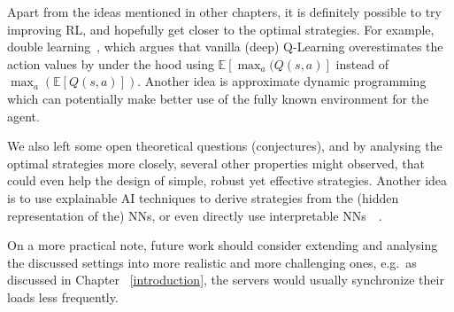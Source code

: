 Apart from the ideas mentioned in other chapters, it is definitely possible to try improving RL, and hopefully get closer to the optimal strategies. For example, double learning~\cite{hasselt2010doubleqlearning}, which argues that vanilla (deep) Q-Learning overestimates the action values by under the hood using $\mathbb{E}[\max_a(Q(s,a)]$ instead of $\max_a(\mathbb{E}[Q(s,a)])$. Another idea is approximate dynamic programming \cite{bellman1959approximatedp} which can potentially make better use of the fully known environment for the agent.


We also left some open theoretical questions (conjectures), and by analysing the optimal strategies more closely, several other properties might observed, that could even help the design of simple, robust yet effective strategies. Another idea is to use explainable AI techniques to derive strategies from the (hidden representation of the) NNs, or even directly use interpretable NNs~\cite{vacareanu2022explainableAI1}~\cite{tang2022explainableAI2}.

On a more practical note, future work should consider extending and analysing the discussed settings into more realistic and more challenging ones, e.g.\ as discussed in Chapter ~\ref{introduction}, the servers would usually synchronize their loads less frequently. 
